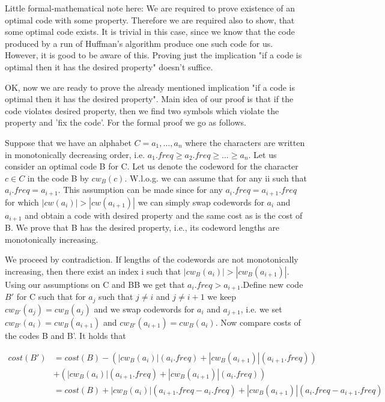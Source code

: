 \documentclass[a4paper, justified]{tufte-handout}
\begin{document}
\begin{solution}
	Little formal-mathematical note here: We are required to prove existence of an optimal code with some property. Therefore we are required also to show, that some optimal code exists. It is trivial in this case, since we know that the code produced by a run of Huffman's algorithm produce one such code for us. However, it is good to be aware of this. Proving just the implication "if a code is optimal then it has the desired property" doesn't suffice.

	OK, now we are ready to prove the already mentioned implication "if a code is optimal then it has the desired property". Main idea of our proof is that if the code violates desired property, then we find two symbols which violate the property and 'fix the code'. For the formal proof we go as follows.

	Suppose that we have an alphabet $C = {a_1, \ldots, a_n}$ where the characters are written in monotonically decreasing order, i.e. $a_1.freq \ge a_2.freq \ge \ldots \ge a_n$. Let us consider an optimal code B for C. Let us denote the codeword for the character $c \in C$ in the code B by $cw_B(c)$. W.l.o.g. we can assume that for any ii such that $a_i.freq = a_{i + 1}$. This assumption can be made since for any $a_i.freq = a_{i + 1}$.$freq$ for which $|cw(a_i)| > |cw(a_{i + 1})|$ we can simply swap codewords for $a_i$ and $a_{i + 1}$
	and obtain a code with desired property and the same cost as is the cost of B. We prove that B has the desired property, i.e., its codeword lengths are monotonically increasing.

	We proceed by contradiction. If lengths of the codewords are not monotonically increasing, then there exist an index i such that $|cw_B(a_i)| > |cw_B(a_{i + 1})|$. Using our assumptions on C and BB we get that $a_i$.$freq > a_{i + 1}$.Define new code $B'$ for C such that for $a_j$ such that $j \ne i$ and $j \ne i + 1$ we keep $cw_{B'}(a_j) = cw_B(a_j)$ and we swap codewords for $a_i$ and $a_{j + 1}$, i.e. we set $cw_{B'}(a_i) = cw_{B}(a_{i + 1})$ and $cw_{B'}(a_{i + 1}) = cw_{B}(a_{i})$. Now compare costs of the codes B and B'. It holds that

	$$\begin{aligned} cost(B') &= cost(B) - (|cw_B(a_i)|(a_i.freq) + |cw_B(a_{i + 1})|(a_{i + 1}.freq)) \\ &+ (|cw_B(a_i)|(a_{i + 1}.freq) + |cw_B(a_{i + 1})|(a_{i}.freq)) \\ &= cost(B) + |cw_B(a_i)|(a_{i + 1}.freq - a_i.freq) + |cw_B(a_{i + 1})|(a_i.freq - a_{i + 1}.freq) \end{aligned}$$


\end{solution}
\end{document}
